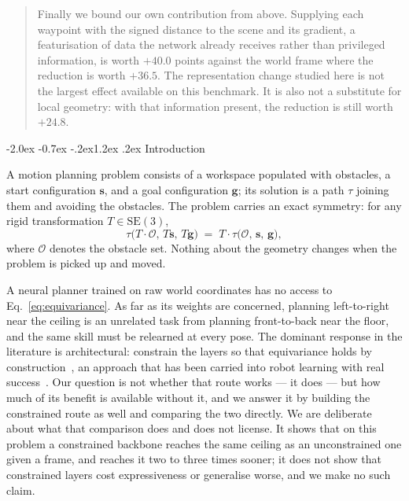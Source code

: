 \documentclass[10pt,twocolumn,letterpaper]{article}
\makeatletter
\renewcommand\section{\@startsection{section}{1}{\z@}%
  {-2.0ex \@plus -0.7ex \@minus -.2ex}{1.2ex \@plus.2ex}%
  {\centering\normalfont\large\bfseries}}
\theoremstyle{plain}
\newcommand{\svec}{\mathbf{s}}
\newcommand{\gvec}{\mathbf{g}}
\newcommand{\SE}{\mathrm{SE}(3)}
\makeatother
\begin{document}
\begin{abstract}
Finally we bound our own contribution from above. Supplying each waypoint with
the signed distance to the scene and its gradient, a featurisation of data the
network already receives rather than privileged information, is worth $+40.0$
points against the world frame where the reduction is worth $+36.5$. The
representation change studied here is not the largest effect available on this
benchmark. It is also not a substitute for local geometry: with that information
present, the reduction is still worth $+24.8$.
\end{abstract}

\section{Introduction}

A motion planning problem consists of a workspace populated with obstacles, a
start configuration $\svec$, and a goal configuration $\gvec$; its solution is a
path $\tau$ joining them and avoiding the obstacles. The problem carries an exact
symmetry: for any rigid transformation $T \in \SE$,
\begin{equation}
  \tau\bigl(T\!\cdot\!\mathcal{O},\, T\svec,\, T\gvec\bigr)
  \;=\; T \cdot \tau\bigl(\mathcal{O},\, \svec,\, \gvec\bigr),
  \label{eq:equivariance}
\end{equation}
where $\mathcal{O}$ denotes the obstacle set. Nothing about the geometry changes
when the problem is picked up and moved.

A neural planner trained on raw world coordinates has no access to
Eq.~\eqref{eq:equivariance}. As far as its weights are concerned, planning
left-to-right near the ceiling is an unrelated task from planning front-to-back
near the floor, and the same skill must be relearned at every pose. The dominant
response in the literature is architectural: constrain the layers so that
equivariance holds by construction~\cite{cohen2016gcnn,thomas2018tfn,fuchs2020se3t,
deng2021vn,geiger2022e3nn}, an approach that has been carried into robot learning
with real success~\cite{ryu2023edf,wang2024equidp,simeonov2022ndf,yang2024equibot}.
Our question is not whether that route works --- it does --- but how much of its
benefit is available without it, and we answer it by building the constrained
route as well and comparing the two directly. We are deliberate about what that
comparison does and does not license. It shows that on this problem a
constrained backbone reaches the same ceiling as an unconstrained one given a
frame, and reaches it two to three times sooner; it does not show that
constrained layers cost expressiveness or generalise worse, and we make no such
claim.
\end{document}
